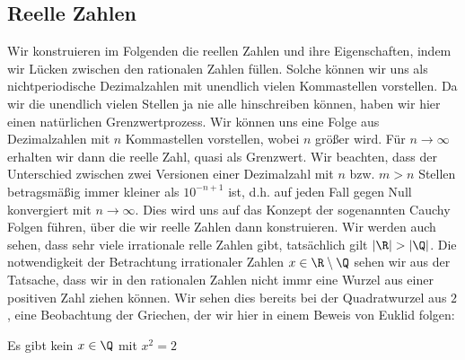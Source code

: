 \documentclass[letterpaper,10pt,english]{jupyterBook}
\begin{document}
\subsection{Reelle Zahlen}
\label{\detokenize{grundlagen/zahlensysteme:reelle-zahlen}}
Wir konstruieren im Folgenden die reellen Zahlen und ihre Eigenschaften, indem wir Lücken zwischen den rationalen Zahlen füllen. Solche können wir uns als nichtperiodische Dezimalzahlen mit unendlich vielen Kommastellen vorstellen. Da wir die unendlich vielen Stellen ja nie alle hinschreiben können, haben wir hier einen natürlichen Grenzwertprozess. Wir können uns eine Folge aus Dezimalzahlen mit \(n\) Kommastellen vorstellen, wobei \(n\) größer wird. Für \(n \rightarrow \infty\) erhalten wir dann die reelle Zahl, quasi als Grenzwert. Wir beachten, dass der Unterschied zwischen zwei Versionen einer Dezimalzahl mit \(n\) bzw. \(m > n\) Stellen betragsmäßig immer kleiner als \(10^{-n+1}\) ist, d.h. auf jeden Fall gegen Null konvergiert mit \(n \rightarrow \infty\). Dies wird uns auf das Konzept der sogenannten Cauchy Folgen führen, über die wir reelle Zahlen dann konstruieren. Wir werden auch sehen, dass sehr viele irrationale relle Zahlen gibt, tatsächlich gilt \(|\R| > |\Q|\).
Die notwendigkeit der Betrachtung irrationaler Zahlen \(x \in \R \setminus \Q\) sehen wir aus der Tatsache, dass wir in den rationalen Zahlen nicht immr eine Wurzel aus einer positiven Zahl ziehen können. Wir sehen dies bereits bei der Quadratwurzel aus \(2\), eine Beobachtung der Griechen, der wir hier in einem Beweis von Euklid folgen:
\label{grundlagen/zahlensysteme:theorem-12}
\begin{theorem}{}{}



Es gibt kein \(x \in \Q\) mit \(x^2 = 2\)
\end{theorem}
\end{document}
